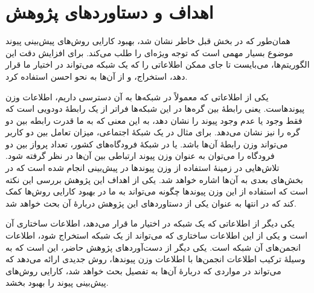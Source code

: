 \section{اهداف و دستاوردهای پژوهش}

همان‌طور که در بخش قبل خاطر نشان شد، بهبود کارایی روش‌های پیش‌بینی پیوند موضوع بسیار مهمی است که توجه ویژه‌ای را طلب می‌کند. برای افزایش دقت این الگوریتم‌ها، می‌بایست تا جای ممکن اطلاعاتی را که یک شبکه می‌تواند در اختیار ما قرار دهد، استخراج، و از آن‌ها به نحو احسن استفاده کرد.


یکی از اطلاعاتی که معمولاً در شبکه‌ها به آن دسترسی داریم، اطلاعات وزن پیوندهاست. یعنی رابطهٔ بین گره‌ها در این شبکه‌ها فراتر از یک رابطهٔ دودویی است که فقط وجود یا عدم وجود پیوند را نشان دهد، به این معنی که به ما قدرت رابطه بین دو گره را نیز نشان می‌دهد. برای مثال در یک شبکهٔ اجتماعی، میزان تعامل بین دو کاربر می‌تواند وزن رابطهٔ آن‌ها باشد. یا در شبکه‌ٔ فرودگاه‌های کشور، تعداد پرواز بین دو فرودگاه را می‌توان به عنوان وزن پیوند ارتباطی بین آن‌ها در نظر گرفته شود. تلاش‌هایی در زمینهٔ استفاده از وزن پیوندها در پیش‌بینی انجام شده است که در بخش‌های بعدی به آن‌ها اشاره خواهد شد. یکی از اهداف این پژوهش بررسی این نکته است که استفاده از این وزن پیوندها چگونه می‌تواند به ما در بهبود کارایی روش‌ها کمک کند که در انتها به عنوان یکی از دستاوردهای این پژوهش دربارهٔ آن بحث خواهد شد.

یکی دیگر از اطلاعاتی که یک شبکه در اختیار ما قرار می‌دهد، اطلاعات ساختاری آن است و یکی از این اطلاعات ساختاری که می‌تواند از یک شبکه استخراج شود، اطلاعات انجمن‌های آن شبکه است. یکی دیگر از دست‌آوردهای پژوهش حاضر، این است که به وسیلهٔ ترکیب اطلاعات انجمن‌ها با اطلاعات وزن پیوندها، روش جدیدی ارائه می‌دهد که می‌تواند در مواردی که دربارهٔ آن‌ها به تفصیل بحث خواهد شد، کارایی روش‌های پیش‌بینی پیوند را بهبود بخشد.

